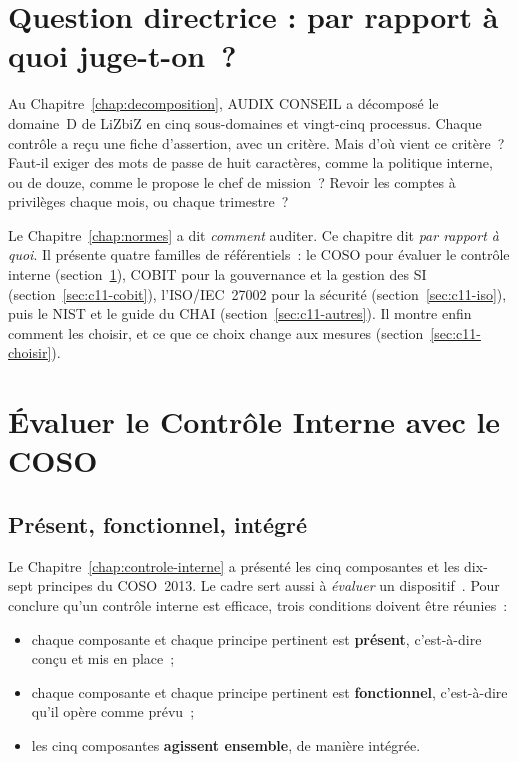 \bigskip

\section*{Question directrice : par rapport à quoi juge-t-on~?}

Au Chapitre~\ref{chap:decomposition}, AUDIX CONSEIL a décomposé le domaine~D
de LiZbiZ en cinq sous-domaines et vingt-cinq processus. Chaque contrôle a
reçu une fiche d'assertion, avec un critère. Mais d'où vient ce critère~?
Faut-il exiger des mots de passe de huit caractères, comme la politique
interne, ou de douze, comme le propose le chef de mission~? Revoir les
comptes à privilèges chaque mois, ou chaque trimestre~?

Le Chapitre~\ref{chap:normes} a dit \emph{comment} auditer. Ce chapitre dit
\emph{par rapport à quoi}. Il présente quatre familles de référentiels~:
le COSO pour évaluer le contrôle interne (section~\ref{sec:c11-coso}), COBIT
pour la gouvernance et la gestion des SI (section~\ref{sec:c11-cobit}),
l'ISO/IEC~27002 pour la sécurité (section~\ref{sec:c11-iso}), puis le NIST
et le guide du CHAI (section~\ref{sec:c11-autres}). Il montre enfin comment
les choisir, et ce que ce choix change aux mesures
(section~\ref{sec:c11-choisir}).

\separateur

\section{Évaluer le Contrôle Interne avec le COSO}
\label{sec:c11-coso}

\subsection{Présent, fonctionnel, intégré}

Le Chapitre~\ref{chap:controle-interne} a présenté les cinq composantes et
les dix-sept principes du COSO~2013. Le cadre sert aussi à \emph{évaluer}
un dispositif~\cite{coso2013ic}. Pour conclure qu'un contrôle interne est
efficace, trois conditions doivent être réunies~:
\begin{itemize}
    \item chaque composante et chaque principe pertinent est
          \textbf{présent}, c'est-à-dire conçu et mis en place~;
    \item chaque composante et chaque principe pertinent est
          \textbf{fonctionnel}, c'est-à-dire qu'il opère comme prévu~;
    \item les cinq composantes \textbf{agissent ensemble}, de manière
          intégrée.
\end{itemize}

